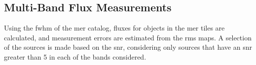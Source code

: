 





\subsection{Multi-Band Flux Measurements}
Using the \gls{fwhm} of the \gls{mer} catalog, fluxes for objects in the \gls{mer} tiles are calculated, and measurement errors are estimated from the \gls{rms} maps. A selection of the sources is made based on the \gls{snr}, considering only sources that have an \gls{snr} greater than 5 in each of the bands considered. 

